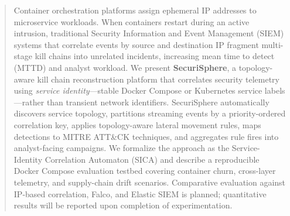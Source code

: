 \documentclass[conference]{IEEEtran}
\begin{document}
{
}

\maketitle

\begin{abstract}
Container orchestration platforms assign ephemeral IP addresses to
microservice workloads. When containers restart during an active intrusion,
traditional Security Information and Event Management (SIEM) systems that
correlate events by source and destination IP fragment multi-stage kill
chains into unrelated incidents, increasing mean time to detect (MTTD) and
analyst workload. We present \textbf{SecuriSphere}, a topology-aware kill
chain reconstruction platform that correlates security telemetry using
\emph{service identity}---stable Docker Compose or Kubernetes service
labels---rather than transient network identifiers. SecuriSphere
automatically discovers service topology, partitions streaming events by a
priority-ordered correlation key, applies topology-aware lateral movement
rules, maps detections to MITRE ATT\&CK techniques, and aggregates rule
fires into analyst-facing campaigns. We formalize the approach as the
Service-Identity Correlation Automaton (SICA) and describe a reproducible
Docker Compose evaluation testbed covering container churn, cross-layer
telemetry, and supply-chain drift scenarios. Comparative evaluation against
IP-based correlation, Falco, and Elastic SIEM is planned; quantitative
results will be reported upon completion of experimentation.
\end{abstract}
\end{document}

